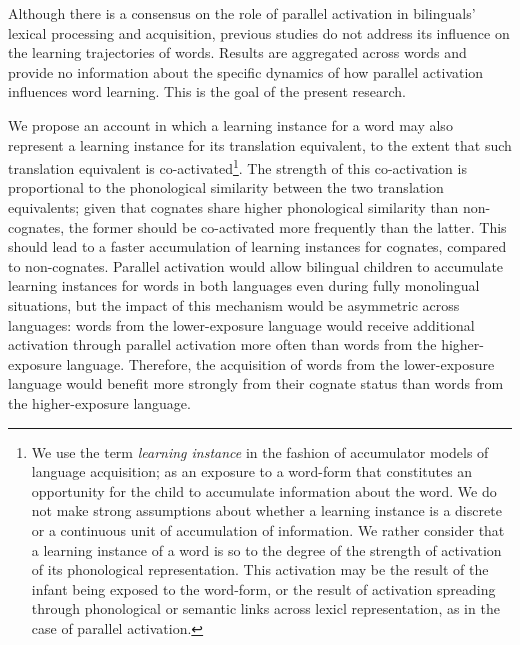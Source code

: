 \documentclass[
]{article}
\begin{document}
Although there is a consensus on the role of parallel activation in
bilinguals' lexical processing and acquisition, previous studies do not
address its influence on the learning trajectories of words. Results are
aggregated across words and provide no information about the specific
dynamics of how parallel activation influences word learning. This is
the goal of the present research.

We propose an account in which a learning instance for a word may also
represent a learning instance for its translation equivalent, to the
extent that such translation equivalent is co-activated\footnote{We use
  the term \emph{learning instance} in the fashion of accumulator models
  of language acquisition; as an exposure to a word-form that
  constitutes an opportunity for the child to accumulate information
  about the word. We do not make strong assumptions about whether a
  learning instance is a discrete or a continuous unit of accumulation
  of information. We rather consider that a learning instance of a word
  is so to the degree of the strength of activation of its phonological
  representation. This activation may be the result of the infant being
  exposed to the word-form, or the result of activation spreading
  through phonological or semantic links across lexicl representation,
  as in the case of parallel activation.}. The strength of this
co-activation is proportional to the phonological similarity between the
two translation equivalents; given that cognates share higher
phonological similarity than non-cognates, the former should be
co-activated more frequently than the latter. This should lead to a
faster accumulation of learning instances for cognates, compared to
non-cognates. Parallel activation would allow bilingual children to
accumulate learning instances for words in both languages even during
fully monolingual situations, but the impact of this mechanism would be
asymmetric across languages: words from the lower-exposure language
would receive additional activation through parallel activation more
often than words from the higher-exposure language. Therefore, the
acquisition of words from the lower-exposure language would benefit more
strongly from their cognate status than words from the higher-exposure
language.
\end{document}
